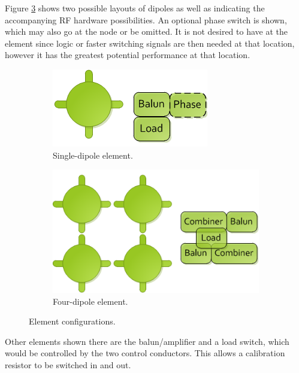 \documentclass[11pt]{article}
\begin{document}
Figure \ref{fig:elements} shows two possible layouts of dipoles as well as indicating the accompanying RF hardware possibilities.  An optional phase switch is shown, which may also go at the node or be omitted.  It is not desired to have at the element since logic or faster switching signals are then needed at that location, however it has the greatest potential performance at that location.
\begin{figure}
\begin{subfigure}[h]{0.5\textwidth}
\centering
\includegraphics[width=\textwidth]{plots/Element1.png}
\caption{Single-dipole element.}
\label{fig:element1}
\end{subfigure}
\begin{subfigure}{0.5\textwidth}
\centering
\includegraphics[width=\textwidth]{plots/Element4.png}
\caption{Four-dipole element.}
\label{fig:element4}
\end{subfigure}
\caption{Element configurations.}
\label{fig:elements}
\end{figure}

Other elements shown there are the balun/amplifier and a load switch, which would be controlled by the two control conductors.  This allows a calibration resistor to be switched in and out.
\end{document}
